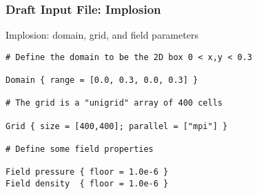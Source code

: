     \begin{frame}[fragile] \frametitle{Draft Input File: Implosion}
 \footnotesize
\begin{block}{Implosion: domain, grid, and field parameters}
\begin{verbatim}
# Define the domain to be the 2D box 0 < x,y < 0.3

Domain { range = [0.0, 0.3, 0.0, 0.3] } 
                                
# The grid is a "unigrid" array of 400 cells
 
Grid { size = [400,400]; parallel = ["mpi"] }

# Define some field properties
                                
Field pressure { floor = 1.0e-6 }
Field density  { floor = 1.0e-6 }
\end{verbatim}
\end{block}
\end{frame}
